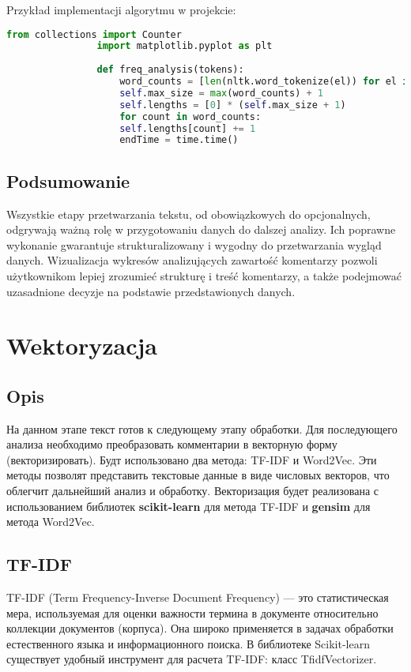 			Przykład implementacji algorytmu w projekcie:
			\begin{lstlisting}[language=Python]
				from collections import Counter
				import matplotlib.pyplot as plt
				
				def freq_analysis(tokens):
					word_counts = [len(nltk.word_tokenize(el)) for el in self.nlp_data]
					self.max_size = max(word_counts) + 1
					self.lengths = [0] * (self.max_size + 1)
					for count in word_counts:
					self.lengths[count] += 1
					endTime = time.time()
			\end{lstlisting}
	
	\subsection{Podsumowanie}
		Wszystkie etapy przetwarzania tekstu, od obowiązkowych do opcjonalnych, odgrywają ważną rolę w przygotowaniu danych do dalszej analizy. Ich poprawne wykonanie gwarantuje strukturalizowany i wygodny do przetwarzania wygląd danych. Wizualizacja wykresów analizujących zawartość komentarzy pozwoli użytkownikom lepiej zrozumieć strukturę i treść komentarzy, a także podejmować uzasadnione decyzje na podstawie przedstawionych danych.
	
	
\section{Wektoryzacja}
	
	\subsection{Opis}
		На данном этапе текст готов к следующему этапу обработки. Для последующего анализа необходимо преобразовать комментарии в векторную форму (векторизировать). Будт использовано два метода: TF-IDF и Word2Vec. Эти методы позволят представить текстовые данные в виде числовых векторов, что облегчит дальнейший анализ и обработку. Векторизация будет реализована с использованием библиотек \textbf{scikit-learn} для метода TF-IDF и \textbf{gensim} для метода Word2Vec.
	
	\subsection{TF-IDF}
 		TF-IDF (Term Frequency-Inverse Document Frequency) — это статистическая мера, используемая для оценки важности термина в документе относительно коллекции документов (корпуса). Она широко применяется в задачах обработки естественного языка и информационного поиска. В библиотеке Scikit-learn существует удобный инструмент для расчета TF-IDF: класс TfidfVectorizer.
		
